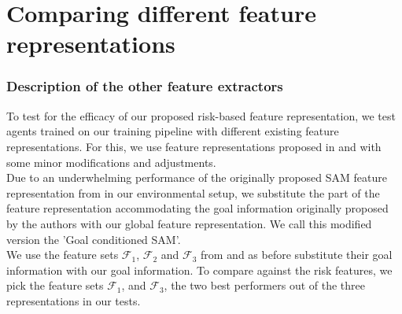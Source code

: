 \section{Comparing different feature representations}
\label{sec:comparing-other-featreps}
\subsubsection*{Description of the other feature extractors}
To test for the efficacy of our proposed risk-based feature representation, we test agents trained on our training pipeline with different existing feature representations. For this, we use feature representations proposed in \cite{fahad_learning_2018} and \cite{vasquez_inverse_2014} with some minor modifications and adjustments.\\
Due to an underwhelming performance of the originally proposed SAM feature representation from \cite{fahad_learning_2018} in our environmental setup, we substitute the part of the feature representation accommodating the goal information originally proposed by the authors with our global feature representation. We call this modified version the 'Goal conditioned SAM'.\\
We use the feature sets $\mathcal{F}_1$, $\mathcal{F}_2$ and $\mathcal{F}_3$ from \cite{vasquez_inverse_2014} and as before substitute their goal information with our goal information.
To compare against the risk features, we pick the feature sets $\mathcal{F}_1$, and $\mathcal{F}_3$, the two best performers out of the three representations in our tests.\\
